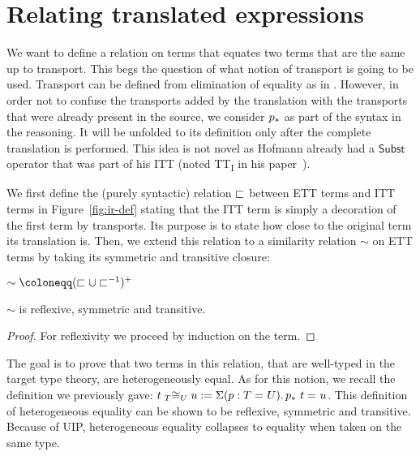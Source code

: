 \chapter{Relating translated expressions}

We want to define a relation on terms that equates two terms that are
the same up to transport.
%
This begs the question of what notion of transport is going to be
used.
%
Transport can be defined from elimination of equality as in .
However, in order not to confuse the transports added by the
translation with the transports that were already present in the
source, we consider $\transpo{p}$ as part of the syntax in the
reasoning. It will be unfolded to its definition only after the
complete translation is performed.
%
This idea is not novel as Hofmann already had a $\mathsf{Subst}$ operator that
was part of his ITT (noted TT\textsubscript{I} in his
paper~).

%
We first define the (purely syntactic) relation $\ir$ between ETT terms
and ITT terms in Figure~\ref{fig:ir-def} stating that the ITT term is
simply a decoration of the first term by transports. Its purpose is to
state how close to the original term its translation is. Then, we extend
this relation to a similarity relation $\sim$ on ETT terms by taking its
symmetric and transitive closure:
\begin{center}$\sim \coloneqq (\ir \cup \ir^{-1})^+$
\end{center}

\begin{lemma}
  \label{lem:sim-er}
  $\sim$ is reflexive, symmetric and transitive.
\end{lemma}

\begin{proof}
  For reflexivity we proceed by induction on the term.
\end{proof}


%

The goal is to prove that two terms in this relation, that are well-typed in the
target type theory, are heterogeneously equal. As for this notion, we recall
the definition we previously gave:
$\Heq{T}{t}{U}{u} := \Sum{p:\Eq{}{T}{U}} \Eq{}{\transpo{p}\ t}{u}$.
%
This definition of heterogeneous equality can be shown to be
reflexive, symmetric and transitive. Because of UIP, heterogeneous
equality collapses to equality when taken on the same type.


